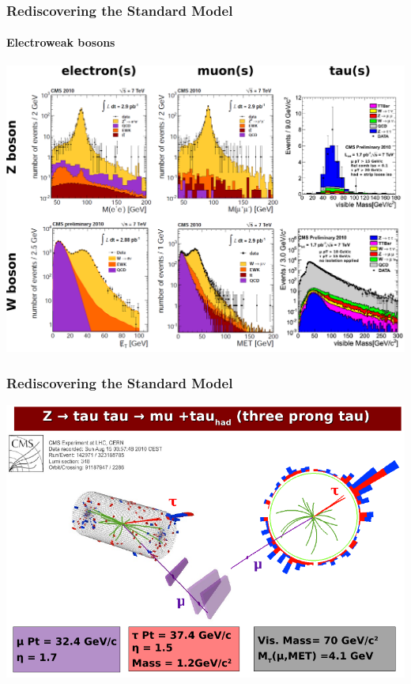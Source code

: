 \documentclass[compress]{beamer}
\begin{document}
\begin{frame}
\frametitle{Rediscovering the Standard Model}
\framesubtitle{Electroweak bosons}
\includegraphics[width=\linewidth]{electroweak2.pdf}
\end{frame}

\begin{frame}
\frametitle{Rediscovering the Standard Model}
\includegraphics[width=\linewidth]{Ztautau_display.png}
\end{frame}
\end{document}
